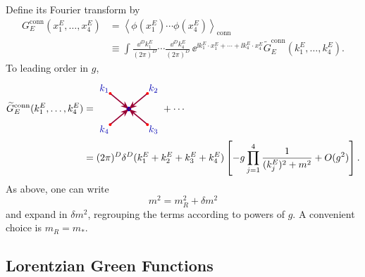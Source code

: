 Define its Fourier transform by
\[
\begin{aligned}
  G_E^{\mathrm{conn}}(x_1^E,\ldots,x_4^E)
  &=
  \left\langle
    \phi(x_1^E)\cdots\phi(x_4^E)
  \right\rangle_{\mathrm{conn}}  \\
  &\equiv
  \int
  \frac{\dd^Dk_1^E}{(2\pi)^D}\cdots
  \frac{\dd^Dk_4^E}{(2\pi)^D}\,
  \ee^{\ii k_1^E\cdot x_1^E+\cdots+\ii k_4^E\cdot x_4^E}
  \widetilde G_E^{\mathrm{conn}}(k_1^E,\ldots,k_4^E).
\end{aligned}
\]
To leading order in \(g\),
\[
\begin{aligned}
  \widetilde G_E^{\mathrm{conn}}(k_1^E,\ldots,k_4^E)
  &=
  \begin{tikzpicture}[baseline=-0.6ex, scale=0.8, >=Stealth]
    \fill[blue!80!black] (0,0) circle (3pt);
    \foreach \ang/\lab in {140/k_1,40/k_2,-40/k_3,-140/k_4} {
      \draw[purple!80!black, very thick, ->]
        ({1.1*cos(\ang)},{1.1*sin(\ang)}) -- (0,0);
      \fill[red] ({1.1*cos(\ang)},{1.1*sin(\ang)}) circle (1.8pt);
      \node[blue!70!black] at ({1.45*cos(\ang)},{1.45*sin(\ang)}) {$\lab$};
    }
  \end{tikzpicture}
  +\cdots  \\
  &=
  (2\pi)^D
  \delta^D(k_1^E+k_2^E+k_3^E+k_4^E)
  \left[
    -g
    \prod_{j=1}^{4}
    \frac{1}{(k_j^E)^2+m^2}
    +O(g^2)
  \right].
\end{aligned}
\]
As above, one can write
\[
  m^2=m_R^2+\delta m^2
\]
and expand in \(\delta m^2\), regrouping the terms according to powers of
\(g\). A convenient choice is \(m_R=m_*\).

\subsection{Lorentzian Green Functions}

